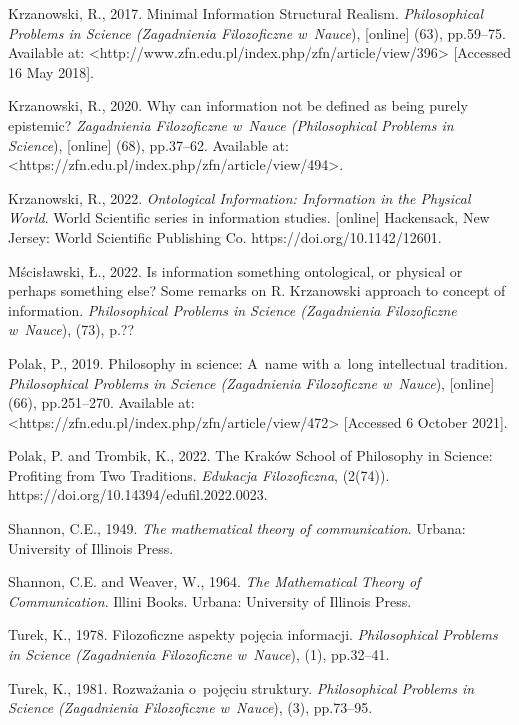 Krzanowski, R., 2017. Minimal Information Structural Realism. \textit{Philosophical Problems in Science (Zagadnienia Filozoficzne w~Nauce}), [online] (63), pp.59–75. Available at: {\textless}http://www.zfn.edu.pl/index.php/zfn/article/view/396{\textgreater} [Accessed 16 May 2018].

Krzanowski, R., 2020. Why can information not be defined as being purely epistemic? \textit{Zagadnienia Filozoficzne w~Nauce (Philosophical Problems in Science}), [online] (68), pp.37–62. Available at: {\textless}https://zfn.edu.pl/index.php/zfn/article/view/494{\textgreater}.

Krzanowski, R., 2022. \textit{Ontological Information: Information in the Physical World}. World Scientific series in information studies. [online] Hackensack, New Jersey: World Scientific Publishing Co. https://doi.org/10.1142/12601.

Mścisławski, Ł., 2022. Is information something ontological, or physical or perhaps something else? Some remarks on R. Krzanowski approach to concept of information. \textit{Philosophical Problems in Science (Zagadnienia Filozoficzne w~Nauce}), (73), p.??

Polak, P., 2019. Philosophy in science: A~name with a~long intellectual tradition. \textit{Philosophical Problems in Science (Zagadnienia Filozoficzne w~Nauce}), [online] (66), pp.251–270. Available at: {\textless}https://zfn.edu.pl/index.php/zfn/article/view/472{\textgreater} [Accessed 6 October 2021].

Polak, P. and Trombik, K., 2022. The Kraków School of Philosophy in Science: Profiting from Two Traditions. \textit{Edukacja Filozoficzna}, (2(74)). https://doi.org/10.14394/edufil.2022.0023.

Shannon, C.E., 1949. \textit{The mathematical theory of communication}. Urbana: University of Illinois Press.

Shannon, C.E. and Weaver, W., 1964. \textit{The Mathematical Theory of Communication}. Illini Books. Urbana: University of Illinois Press.

Turek, K., 1978. Filozoficzne aspekty pojęcia informacji. \textit{Philosophical Problems in Science (Zagadnienia Filozoficzne w~Nauce}), (1), pp.32–41.

Turek, K., 1981. Rozważania o~pojęciu struktury. \textit{Philosophical Problems in Science (Zagadnienia Filozoficzne w~Nauce}), (3), pp.73–95.

